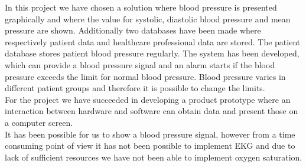 In this project we have chosen a solution where blood pressure is presented graphically and where the value for systolic, diastolic blood pressure and mean pressure are shown. Additionally two databases have been made where respectively patient data and healthcare professional data are stored. The patient database stores patient blood pressure regularly. The system has been developed, which can provide a blood pressure signal and an alarm starts if the blood pressure exceeds the limit for normal blood pressure. Blood pressure varies in different patient groups and therefore it is possible to change the limits. \\
For the project we have succeeded in developing a product prototype where an interaction between hardware and software can obtain data and present those on a computer screen. \\
It has been possible for us to show a blood pressure signal, however from a time consuming point of view it has not been possible to implement EKG and due to lack of sufficient resources we have not been able to implement oxygen saturation. 
